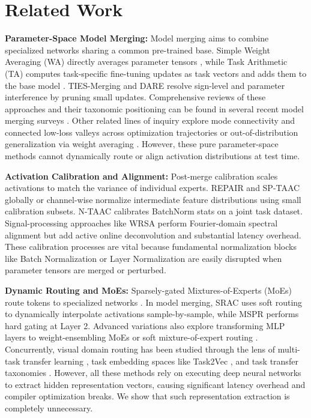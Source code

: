 \documentclass{article}
\theoremstyle{plain}
\theoremstyle{definition}
\theoremstyle{remark}
\begin{document}
\section{Related Work}
\label{sec:related}
\textbf{Parameter-Space Model Merging:} Model merging aims to combine specialized networks sharing a common pre-trained base. Simple Weight Averaging (WA) directly averages parameter tensors \citep{Wortsman_2022, Bansal_2022}, while Task Arithmetic (TA) computes task-specific fine-tuning updates as task vectors and adds them to the base model \citep{Ilharco_2023}. TIES-Merging \citep{Yadav_2023} and DARE \citep{Yu_2024} resolve sign-level and parameter interference by pruning small updates. Comprehensive reviews of these approaches and their taxonomic positioning can be found in several recent model merging surveys \citep{yang2024survey, wolfe2024modelmerging}. Other related lines of inquiry explore mode connectivity and connected low-loss valleys across optimization trajectories \citep{garipov2018loss, Izmailov_2018} or out-of-distribution generalization via weight averaging \citep{Rame_2022}. However, these pure parameter-space methods cannot dynamically route or align activation distributions at test time.

\textbf{Activation Calibration and Alignment:} Post-merge calibration scales activations to match the variance of individual experts. REPAIR \citep{Jordan_2023} and SP-TAAC \citep{Authors_2026c} globally or channel-wise normalize intermediate feature distributions using small calibration subsets. N-TAAC \citep{Authors_2026b} calibrates BatchNorm stats on a joint task dataset. Signal-processing approaches like WRSA \citep{Authors_2026d} perform Fourier-domain spectral alignment but add active online deconvolution and substantial latency overhead. These calibration processes are vital because fundamental normalization blocks like Batch Normalization \citep{Ioffe_2015} or Layer Normalization \citep{Ba_2016} are easily disrupted when parameter tensors are merged or perturbed.

\textbf{Dynamic Routing and MoEs:} Sparsely-gated Mixtures-of-Experts (MoEs) route tokens to specialized networks \citep{Shazeer_2017, Fedus_2022, Riquelme_2021}. In model merging, SRAC \citep{Authors_2026a} uses soft routing to dynamically interpolate activations sample-by-sample, while MSPR \citep{Authors_2026b} performs hard gating at Layer 2. Advanced variations also explore transforming MLP layers to weight-ensembling MoEs \citep{shen2024wemoe} or soft mixture-of-expert routing \citep{Ruiz_2023}. Concurrently, visual domain routing has been studied through the lens of multi-task transfer learning \citep{Caruana_1997, Puigcerver_2020}, task embedding spaces like Task2Vec \citep{Achille_2019}, and task transfer taxonomies \citep{Zamir_2018}. However, all these methods rely on executing deep neural networks to extract hidden representation vectors, causing significant latency overhead and compiler optimization breaks. We show that such representation extraction is completely unnecessary.
\end{document}
